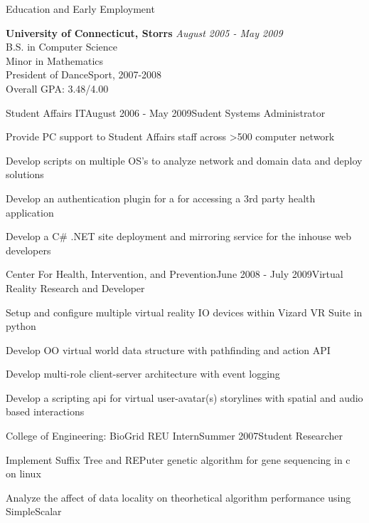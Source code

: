 \documentclass{resume} %
\begin{document}

\begin{rSection}{Education and Early Employment}

{\bf University of Connecticut, Storrs} \hfill {\em August 2005 - May 2009} \\ 
B.S. in Computer Science \\
Minor in Mathematics \smallskip \\
President of DanceSport, 2007-2008 \\
Overall GPA: 3.48/4.00 

\begin{rSubsection}{Student Affairs IT}{August 2006 - May 2009}{Sudent Systems Administrator}{}
\setlength{\itemindent}{1em}
\item Provide PC support to Student Affairs staff across \textgreater500 computer network
\item Develop scripts on multiple OS's to analyze network and domain data and deploy solutions
\item Develop an authentication plugin for a for accessing a 3rd party health application
\item Develop a C\# .NET site deployment and mirroring service for the inhouse web developers
\end{rSubsection}

\begin{rSubsection}{Center For Health, Intervention, and Prevention}{June 2008 - July 2009}{Virtual Reality Research and Developer}{}
\setlength{\itemindent}{1em}
\item Setup and configure multiple virtual reality IO devices within Vizard VR Suite in python
\item Develop OO virtual world data structure with pathfinding and action API
\item Develop multi-role client-server architecture with event logging
\item Develop a scripting api for virtual user-avatar(s) storylines with spatial and audio based interactions
\end{rSubsection}

\begin{rSubsection}{College of Engineering: BioGrid REU Intern}{Summer 2007}{Student Researcher}{}
\setlength{\itemindent}{1em}
\item Implement Suffix Tree and REPuter genetic algorithm for gene sequencing in c on linux
\item Analyze the affect of data locality on theorhetical algorithm performance using SimpleScalar
\end{rSubsection}


\end{rSection}
\end{document}
